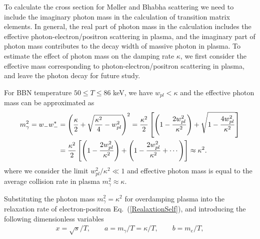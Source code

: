 To calculate the cross section for  M{\o}ller and Bhabha scattering we need to include the imaginary photon mass in the calculation of transition matrix elements. In general, the real part of photon mass in the calculation includes the effective photon-electron/positron scattering in plasma, and the imaginary part of photon mass contributes to the decay width of massive photon in plasma. To estimate the effect of photon mass on the damping rate $\kappa$, we first consider the effective mass corresponding to photon-electron/positron scattering in plasma, and leave the photon decay for future study.

For BBN temperature $50\leqslant T\leqslant 86$ keV,
we have $w_{pl}<\kappa$ and the effective photon mass can be approximated as
\begin{align}
m^2_\gamma=w_-w_-^\ast&=\left(\frac{\kappa}{2}+\sqrt{\frac{\kappa^2}{4}-w^2_{pl}}\right)^2
=\frac{\kappa^2}{2}\left[\left(1-\frac{2w^2_{pl}}{\kappa^2}\right)+\sqrt{1-\frac{4w^2_{pl}}{\kappa^2}}\right]\notag\\
&=\frac{\kappa^2}{2}\left[\left(1-\frac{2w^2_{pl}}{\kappa^2}\right)+\left(1-\frac{2w^2_{pl}}{\kappa^2}+\cdots\right)\right]\approx\kappa^2.
\label{PhotonMassPlasma002}
\end{align}
where we consider the limit $w^2_{pl}/\kappa^2\ll1$ and effective photon mass is equal to the average collision rate in plasma $m^2_\gamma\approx\kappa$.

Substituting the photon mass $m^2_\gamma=\kappa^2$ for overdamping plasma into the relaxation rate of electron-positron Eq.~(\ref{RealaxtionSelf}), and introducing the following dimensionless variables
\begin{align}
x=\sqrt{s}/T,\qquad a=m_\gamma/T=\kappa/T,\qquad b=m_e/T,
\end{align}


